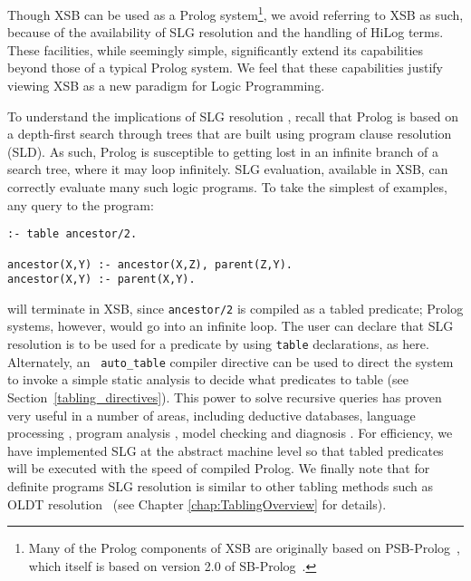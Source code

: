 Though XSB can be used as a Prolog system\footnote{Many of the Prolog
components of XSB are originally based on PSB-Prolog~\cite{Xu90},
which itself is based on version 2.0 of SB-Prolog~\cite{Debr88}.}, we
avoid referring to XSB as such, because of the availability of SLG
resolution and the handling of HiLog terms.  These facilities, while
seemingly simple, significantly extend its capabilities beyond those
of a typical Prolog system. We feel that these capabilities justify
viewing XSB as a new paradigm for Logic Programming.

To understand the implications of SLG resolution \cite{ChWa96}, recall
that Prolog is based on a depth-first search through trees that are
built using program clause resolution (SLD).  As such, Prolog is
susceptible to getting 
lost in an infinite branch of a search tree, where it may loop
infinitely.  SLG evaluation, available in XSB, can correctly evaluate
many such logic programs.  To take the simplest of examples, any query
to the program:
\begin{center}
\begin{minipage}{3.8in}
\begin{verbatim}
:- table ancestor/2.

ancestor(X,Y) :- ancestor(X,Z), parent(Z,Y).
ancestor(X,Y) :- parent(X,Y).
\end{verbatim}
\end{minipage}
\end{center}
will terminate in XSB, since {\tt ancestor/2} is compiled as a tabled
predicate; Prolog systems, however, would go into an infinite loop.
The user can declare that SLG resolution is to be used for a predicate
by using {\tt table} declarations, as here.  Alternately, an {\tt
auto\_table} compiler directive can be used to direct the system to
invoke a simple static analysis to decide what predicates to table
(see Section~\ref{tabling_directives}).  This power to solve recursive
queries has proven very useful in a number of areas, including
deductive databases, language processing \cite{syntactica, semantica},
program analysis \cite{DRW96, CoDS96, Boul97}, model checking
\cite{RRRSSW97} and diagnosis \cite{GSTPD00}.  For efficiency, we
have implemented SLG at the abstract machine level so that tabled
predicates will be executed with the speed of compiled Prolog.  We
finally note that for definite programs SLG resolution is similar to
other tabling methods such as OLDT resolution~\cite{TaSa86} (see
Chapter
\ref{chap:TablingOverview} for details).

